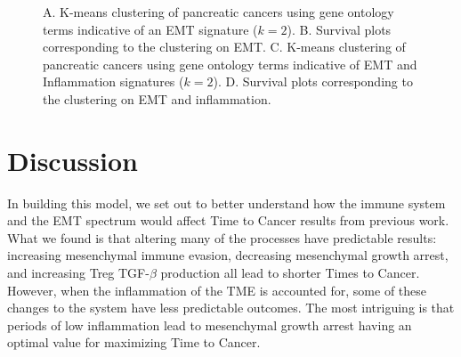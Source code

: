 \documentclass[11pt, preprint]{article}
\begin{document}
\begin{figure}[H]
\center
{}
\caption{A. K-means clustering of pancreatic cancers using gene ontology terms indicative of an EMT signature ($k=2$). B. Survival plots corresponding to the clustering on EMT. C. K-means clustering of pancreatic cancers using gene ontology terms indicative of EMT and Inflammation signatures ($k=2$). D. Survival plots corresponding to the clustering on EMT and inflammation.}
\label{fig:tcga}
\end{figure}




\section{Discussion}\label{Discussion}
In building this model, we set out to better understand how the immune system and the EMT spectrum would affect Time to Cancer results from previous work.
What we found is that altering many of the processes have predictable results: increasing mesenchymal immune evasion, decreasing mesenchymal growth arrest, and increasing Treg TGF-$\beta$ production all lead to shorter Times to Cancer.
However, when the inflammation of the TME is accounted for, some of these changes to the system have less predictable outcomes.
The most intriguing is that periods of low inflammation lead to mesenchymal growth arrest having an optimal value for maximizing Time to Cancer.
\end{document}

